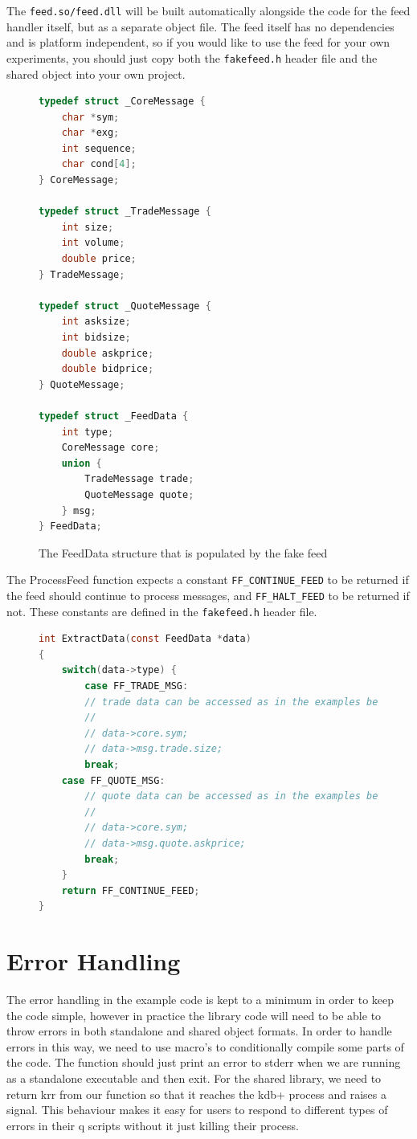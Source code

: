 The \verb|feed.so/feed.dll| will be built automatically alongside the code for the feed handler itself, but as a separate object file. The feed itself has no dependencies and is platform independent, so if you would like to use the feed for your own experiments, you should just copy both the \verb|fakefeed.h| header file and the shared object into your own project.

\begin{figure}[h]
\begin{lstlisting}[language=C]
typedef struct _CoreMessage {
	char *sym;
	char *exg;
	int sequence;
	char cond[4];
} CoreMessage;

typedef struct _TradeMessage {
	int size;
	int volume;
	double price;
} TradeMessage;

typedef struct _QuoteMessage {
	int asksize;
	int bidsize;
	double askprice;
	double bidprice;
} QuoteMessage;

typedef struct _FeedData {
	int type;
	CoreMessage core;
	union {
		TradeMessage trade;
		QuoteMessage quote;
	} msg;
} FeedData;

\end{lstlisting}
\caption{The FeedData structure that is populated by the fake feed}
\end{figure}

The ProcessFeed function expects a constant \verb|FF_CONTINUE_FEED| to be returned if the feed should continue to process messages, and \verb|FF_HALT_FEED| to be returned if not. These constants are defined in the \verb|fakefeed.h| header file.

\begin{figure}
\begin{lstlisting}[language=C]
int ExtractData(const FeedData *data)
{
	switch(data->type) {
		case FF_TRADE_MSG:
		// trade data can be accessed as in the examples below.
		//
		// data->core.sym;
		// data->msg.trade.size;
		break;
	case FF_QUOTE_MSG:
		// quote data can be accessed as in the examples below.
		//
		// data->core.sym;
		// data->msg.quote.askprice;
		break;
	}
	return FF_CONTINUE_FEED;
}

\end{lstlisting}
\caption{}
\end{figure}

\section{Error Handling}

The error handling in the example code is kept to a minimum in order to keep the code simple, however in practice the library code will need to be able to
throw errors in both standalone and shared object formats. In order to handle errors in this way, we need to use macro's to conditionally compile some parts of
the code. The function should just print an error to stderr when we are running as a standalone executable and then exit. For the shared library, we need to
return krr from our function so that it reaches the kdb+ process and raises a signal. This behaviour makes it easy for users to respond to different types of errors
in their q scripts without it just killing their process.

